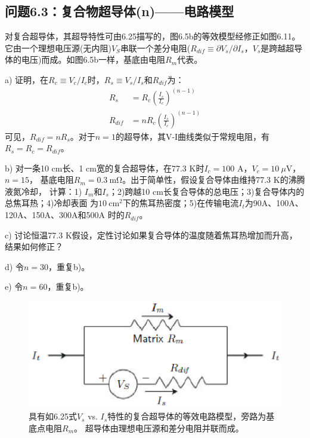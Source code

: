 \subsection{问题6.3：复合物超导体(n)——电路模型}
对复合超导体，其超导特性可由6.25描写的，图6.5b的等效模型经修正如图6.11。
它由一个理想电压源(无内阻)$V_S$串联一个差分电阻($R_{dif}\equiv \partial V_s/\partial I_s$，$V_s$是跨越超导体的电压)而成。如图6.5b一样，基底由电阻$R_m$代表。

a) 证明，在$R_c\equiv V_c/I_c$时，$R_s\equiv V_s/I_s$和$R_{dif}$为：
\begin{subequations}
	\begin{align}
	R_s&=R_c(\frac{I_s}{I_c})^{(n-1)}\\
	R_{dif}&=nR_c(\frac{I_s}{I_c})^{(n-1)}
	\end{align}
\end{subequations}
可见，$R_{dif}=nR_s$。对于$n=1$的超导体，其V-I曲线类似于常规电阻，有$R_s=R_c=R_{dif}$。

b) 对一条10 cm长、1 cm宽的复合超导体，在77.3 K时$I_c=100$ A，$V_c=10\ \mu$V，$n=15$，
基底电阻$R_m=0.3\ \mathrm{m\Omega}$。出于简单性，假设复合导体由维持77.3 K的沸腾液氮冷却， 
计算：1) $I_m$和$I_s$；2)跨越10 cm长复合导体的总电压；3)复合导体内的总焦耳热；4)冷却表面
为$10\ \mathrm{cm^2}$下的焦耳热密度；5)在传输电流$I_t$为90A、100A、120A、150A、300A和500A
时的$R_{dif}$。

c) 讨论恒温77.3 K假设，定性讨论如果复合导体的温度随着焦耳热增加而升高，结果如何修正？

d) 令$n=30$，重复b)。

e) 令$n=60$，重复b)。
\begin{figure}[htbp]
	\centering
	\includegraphics[scale=0.7]{chpt6/figs/fig6.11.eps}
	\caption{具有如6.25式$V_s$ vs. $I_s$特性的复合超导体的等效电路模型，旁路为基底点电阻$R_m$。
	超导体由理想电压源和差分电阻并联而成。}
\end{figure}

